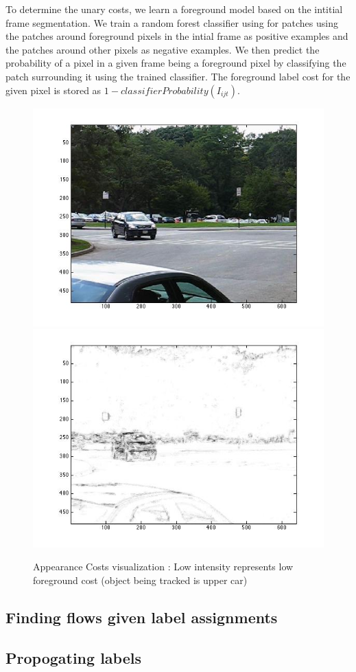 To determine the unary costs, we learn a foreground model based on
the intitial frame segmentation. We train a random forest classifier
using for patches using the patches around foreground pixels in the
intial frame as positive examples and the patches around other pixels
as negative examples. We then predict the probability of a pixel in
a given frame being a foreground pixel by classifying the patch surrounding
it using the trained classifier. The foreground label cost for the
given pixel is stored as $1-classifierProbability(I_{ijt})$.

\begin{figure}[H]
\begin{centering}
\includegraphics[scale=0.2]{figures/UnaryCostGT}\includegraphics[scale=0.2]{figures/UnaryCost}\caption{Appearance Costs visualization : Low intensity represents low foreground cost
(object being tracked is upper car)}

\par\end{centering}

\end{figure}



\subsection{Finding flows given label assignments}


\subsection{Propogating labels}